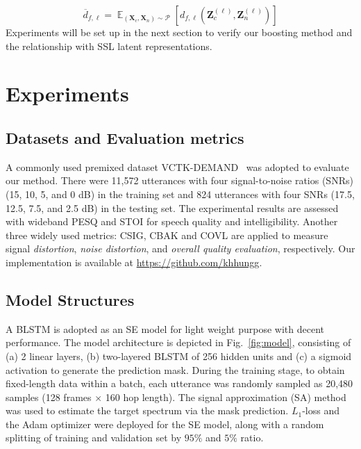 \documentclass[a4paper]{article}
\begin{document}
\begin{equation}\label{E:avg CN distance}
\overline{d}_{f, \ell} =  \mathop{\mathbb{E}}_{(\mathbf{X}_c, \mathbf{X}_n) \sim \mathcal{P}} \left[ d_{f, \ell} \left( \mathbf{Z}^{(\ell)}_c,  \mathbf{Z}^{(\ell)}_n \right) \right]
\end{equation}
Experiments will be set up in the next section to verify our boosting method and the relationship with SSL latent representations.

















\section{Experiments}

\subsection{Datasets and Evaluation metrics}
A commonly used premixed dataset VCTK-DEMAND~\cite{valentini2016investigating} was adopted to evaluate our method. There were 11,572 utterances with four signal-to-noise ratios (SNRs) (15, 10, 5, and 0 dB) in the training set and 824 utterances with four SNRs (17.5, 12.5, 7.5, and 2.5 dB) in the testing set. The experimental results are assessed with wideband PESQ and STOI for speech quality and intelligibility. Another three widely used metrics: CSIG, CBAK and COVL are applied to measure signal \textit{distortion}, \textit{noise distortion}, and \textit{overall quality evaluation}, respectively. Our implementation is available at \url{https://github.com/khhungg}.


\subsection{Model Structures}
A BLSTM is adopted as an SE model for light weight purpose with decent performance. The model architecture is depicted in Fig.~\ref{fig:model}, consisting of 
(a) 2 linear layers, (b) two-layered BLSTM of 256 hidden units and (c) a sigmoid activation to generate the prediction mask. During the training stage, to obtain fixed-length data within a batch, each utterance was randomly sampled as 20,480 samples (128 frames $\times$ 160 hop length). The signal approximation (SA) method~\cite{liu2019supervised} was used to estimate the target spectrum via the mask prediction. $L_1$-loss and the Adam optimizer were deployed for the SE model, along with a random splitting of training and validation set by $95\%$ and $5\%$ ratio.
\end{document}
